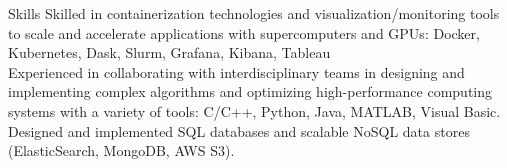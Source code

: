 \documentclass{resume} %
\begin{document}

\begin{rSection}{Skills}
Skilled in containerization technologies and visualization/monitoring tools to scale and accelerate applications with supercomputers and GPUs: Docker, Kubernetes, Dask, Slurm, Grafana, Kibana, Tableau \\
Experienced in collaborating with interdisciplinary teams in designing and implementing complex algorithms and optimizing high-performance computing systems with a variety of tools: C/C++, Python, Java, MATLAB, Visual Basic.\\
Designed and implemented SQL databases and scalable NoSQL data stores (ElasticSearch, MongoDB, AWS S3). \\

\end{rSection}

\end{document}
